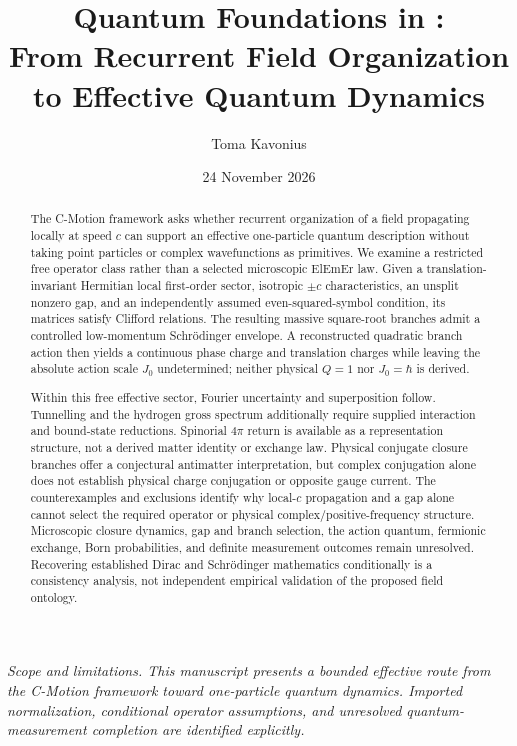 \documentclass[11pt]{article}
\title{\textbf{Quantum Foundations in \cmotion:\\
From Recurrent Field Organization to Effective Quantum Dynamics}}
\author{Toma Kavonius}
\date{24 November 2026}
\theoremstyle{definition}
\begin{document}
\maketitle

\begin{center}
\small\itshape
Scope and limitations.  This manuscript presents a bounded effective route from the
C-Motion framework toward one-particle quantum dynamics.  Imported normalization,
conditional operator assumptions, and unresolved quantum-measurement completion are
identified explicitly.
\end{center}
\vspace{0.6em}

\begin{abstract}
The C-Motion framework asks whether recurrent organization of a field
propagating locally at speed $c$ can support an effective one-particle quantum
description without taking point particles or complex wavefunctions as primitives.
We examine a restricted free operator class rather than a selected microscopic
ElEmEr law.  Given a translation-invariant Hermitian local first-order sector,
isotropic $\pm c$ characteristics, an unsplit nonzero gap, and an independently
assumed even-squared-symbol condition, its matrices satisfy Clifford relations.
The resulting massive square-root branches admit a controlled low-momentum
Schr\"odinger envelope.  A reconstructed quadratic branch action then yields a
continuous phase charge and translation charges while leaving the absolute
action scale $J_0$ undetermined; neither physical $Q=1$ nor $J_0=\hbar$ is
derived.

Within this free effective sector, Fourier uncertainty and superposition
follow.  Tunnelling and the hydrogen gross spectrum additionally require
supplied interaction and bound-state reductions.  Spinorial $4\pi$ return is
available as a representation structure, not a derived matter identity or
exchange law.  Physical conjugate closure branches offer a conjectural
antimatter interpretation, but complex conjugation alone does not establish
physical charge conjugation or opposite gauge current.  The counterexamples
and exclusions identify why local-$c$ propagation and a gap alone cannot select
the required operator or physical complex/positive-frequency structure.
Microscopic closure dynamics, gap and branch selection, the action quantum,
fermionic exchange, Born probabilities, and definite measurement outcomes
remain unresolved.  Recovering established Dirac and Schr\"odinger mathematics
conditionally is a consistency analysis, not independent empirical validation
of the proposed field ontology.
\end{abstract}
\end{document}
